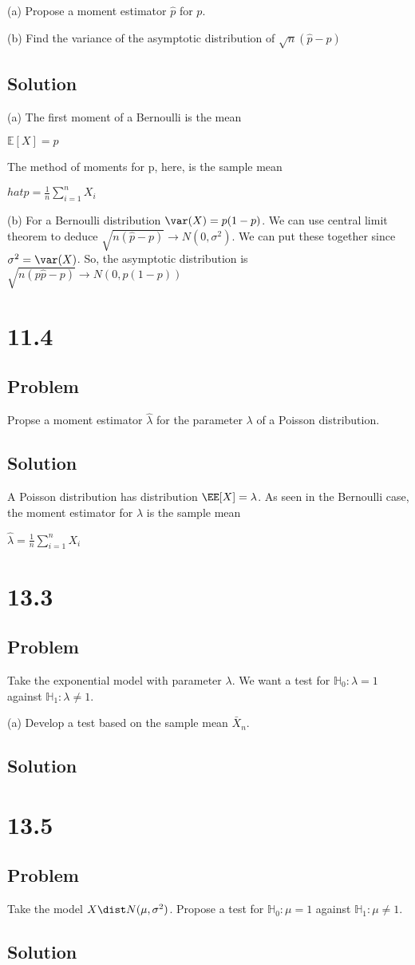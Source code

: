 \documentclass[10pt, a4paper]{article}
\begin{document}
      (a) Propose a moment estimator $\hat p$ for $p$.

      (b) Find the variance of the asymptotic distribution of $\sqrt{n}(\hat p-p)$

    \subsection*{Solution}
      (a) The first moment of a Bernoulli is the mean
      \begin{center}
        $\mathbb{E}[X]=p$
      \end{center}
      The method of moments for p, here, is the sample mean
      \begin{center}
        $\boxed{hat p = \frac{1}{n}\sum_{i=1}^nX_i}$
      \end{center}
      (b) For a Bernoulli distribution $\var(X)=p(1-p)$. We can use central limit theorem to deduce $\sqrt{n(\hat p-p)}\rightarrow N(0,\sigma^2)$. We can put these together since $\sigma^2 = \var(X)$. So, the asymptotic distribution is $\sqrt{n(p\hat p-p)} \rightarrow N(0,p(1-p))$ 
  \section*{11.4}
    \subsection*{Problem}
      Propse a moment estimator $\hat\lambda$ for the parameter $\lambda$ of a Poisson distribution.  
    \subsection*{Solution}
      A Poisson distribution has distribution $\EE[X]=\lambda$. As seen in the Bernoulli case, the moment estimator for $\lambda$ is the sample mean
      \begin{center}
        $\boxed{\hat\lambda = \frac{1}{n}\sum_{i=1}^n X_i}$
      \end{center}
  \section*{13.3}
    \subsection*{Problem}
      Take the exponential model with parameter $\lambda$. We want a test for $\mathbb{H}_0:\lambda=1$ against $\mathbb{H}_1:\lambda\ne1$.

      (a) Develop a test based on the sample mean $\bar X_n$.
    \subsection*{Solution}

  \section*{13.5}
    \subsection*{Problem}
      Take the model $X\dist N(\mu,\sigma^2)$. Propose a test for $\mathbb{H}_0:\mu=1$ against $\mathbb{H}_1:\mu\ne1$. 
    \subsection*{Solution}
\end{document}
